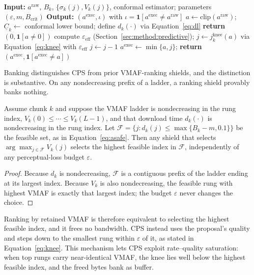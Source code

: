 \begin{algorithm}[!t]
\footnotesize
\caption{Certified Perceptual Shield (compact)}
\label{alg:cps}
\begin{algorithmic}[1]
\STATE \textbf{Input:} \(a^{\mathrm{raw}}\), \(B_k\), \(\{\sigma_k(j),V_k(j)\}\), conformal estimator; parameters \((\varepsilon,m,B_{\mathrm{crit}})\)
\STATE \textbf{Output:} \((a^{\mathrm{exec}},\iota)\) with \(\iota=\mathbf{1}[a^{\mathrm{exec}}\neq a^{\mathrm{raw}}]\)
\STATE \(a\leftarrow\mathrm{clip}(a^{\mathrm{raw}})\); \(\underline{C}_k\leftarrow\) conformal lower bound; define \(d_k(\cdot)\) via Equation~\eqref{eq:dl}
 \STATE \textbf{return} \((0,\mathbf{1}[a\neq0])\) \ENDIF
\STATE compute \(\varepsilon_{\mathrm{eff}}\) (Section~\ref{sec:method:predictive}); \(j\leftarrow j^{\mathrm{knee}}_k(a)\) via Equation~\eqref{eq:knee} with \(\varepsilon_{\mathrm{eff}}\)
 \STATE \(j\leftarrow j-1\) \ENDWHILE
\STATE \(a^{\mathrm{exec}}\leftarrow\min\{a,j\}\); \textbf{return} \((a^{\mathrm{exec}},\mathbf{1}[a^{\mathrm{exec}}\neq a])\)
\end{algorithmic}
\end{algorithm}

Banking distinguishes CPS from prior VMAF-ranking shields, and the distinction is substantive. On any nondecreasing prefix of a ladder, a ranking shield provably banks nothing.

\begin{proposition}
\label{prop:collapse}
Assume chunk \(k\) and suppose the VMAF ladder is nondecreasing in the rung index, \(V_k(0)\le\cdots\le V_k(L-1)\), and that download time \(d_k(\cdot)\) is nondecreasing in the rung index.
Let \(\mathcal{F}=\{j: d_k(j)\le \max\{B_k-m,0.1\}\}\) be the feasible set, as in Equation~\eqref{eq:asafe}.
Then any shield that selects \(\arg\max_{j\in\mathcal{F}} V_k(j)\) selects the highest feasible index in \(\mathcal{F}\), independently of any perceptual-loss budget \(\varepsilon\).
\end{proposition}
\begin{proof}
Because \(d_k\) is nondecreasing, \(\mathcal{F}\) is a contiguous prefix of the ladder ending at its largest index.
Because \(V_k\) is also nondecreasing, the feasible rung with highest VMAF is exactly that largest index; the budget \(\varepsilon\) never changes the choice.
\end{proof}
Ranking by retained VMAF is therefore equivalent to selecting the highest feasible index, and it frees no bandwidth.
CPS instead uses the proposal's quality and steps down to the smallest rung within \(\varepsilon\) of it, as stated in Equation~\eqref{eq:knee}.
This mechanism lets CPS exploit rate--quality saturation: when top rungs carry near-identical VMAF, the knee lies well below the highest feasible index, and the freed bytes bank as buffer.

